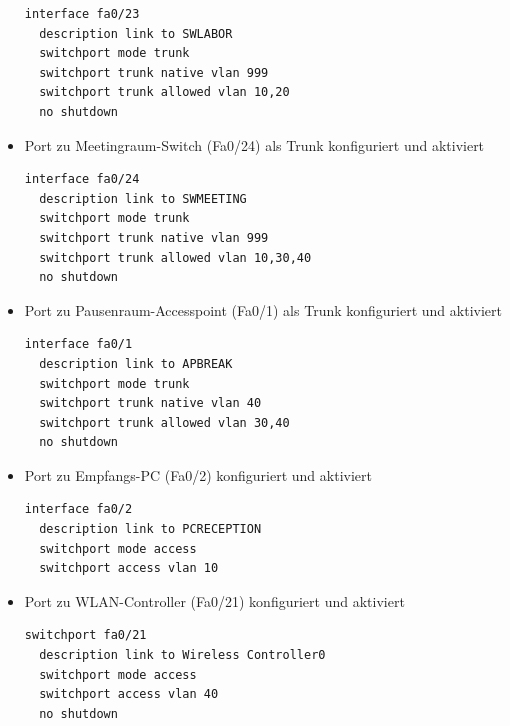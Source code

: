\documentclass[11pt]{article}
\begin{document}
\begin{itemize}
\begin{verbatim}
interface fa0/23
  description link to SWLABOR
  switchport mode trunk
  switchport trunk native vlan 999
  switchport trunk allowed vlan 10,20
  no shutdown
\end{verbatim}
\item Port zu Meetingraum-Switch (Fa0/24) als Trunk konfiguriert und aktiviert
\begin{verbatim}
interface fa0/24
  description link to SWMEETING
  switchport mode trunk
  switchport trunk native vlan 999
  switchport trunk allowed vlan 10,30,40
  no shutdown
\end{verbatim}
\item Port zu Pausenraum-Accesspoint (Fa0/1) als Trunk konfiguriert und aktiviert
\begin{verbatim}
interface fa0/1
  description link to APBREAK
  switchport mode trunk
  switchport trunk native vlan 40
  switchport trunk allowed vlan 30,40
  no shutdown
\end{verbatim}
\item Port zu Empfangs-PC (Fa0/2) konfiguriert und aktiviert
\begin{verbatim}
interface fa0/2
  description link to PCRECEPTION
  switchport mode access
  switchport access vlan 10
\end{verbatim}
\item Port zu WLAN-Controller (Fa0/21) konfiguriert und aktiviert
\begin{verbatim}
switchport fa0/21
  description link to Wireless Controller0
  switchport mode access
  switchport access vlan 40
  no shutdown
\end{verbatim}
\end{itemize}
\end{document}
